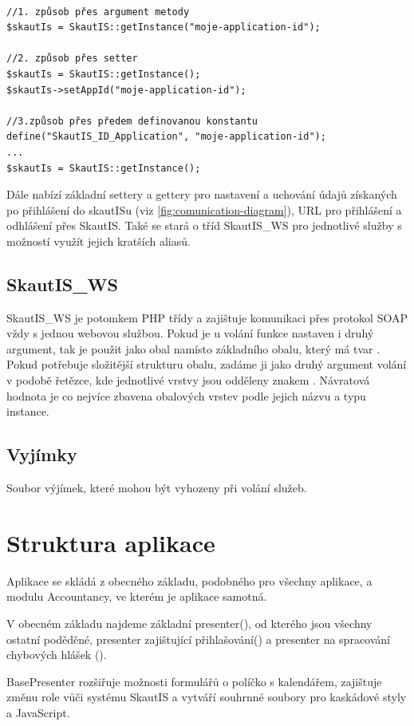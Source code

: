 \documentclass[thesis=B,czech]{FITthesis}[2011/06/14]
\begin{document}
\begin{verbatim}

//1. způsob přes argument metody
$skautIs = SkautIS::getInstance("moje-application-id");

//2. způsob přes setter
$skautIs = SkautIS::getInstance();
$skautIs->setAppId("moje-application-id"); 

//3.způsob přes předem definovanou konstantu
define("SkautIS_ID_Application", "moje-application-id"); 
...
$skautIs = SkautIS::getInstance(); 
\end{verbatim}

Dále nabízí základní settery a gettery pro nastavení a uchování údajů získaných po přihlášení do skautISu (viz \ref{fig:comunication-diagram}), URL pro přihlášení a odhlášení přes SkautIS. Také se stará o  tříd SkautIS\_WS pro jednotlivé služby s možností využít jejich kratších aliasů. 

\subsection{SkautIS\_WS}
SkautIS\_WS je potomkem PHP třídy  a zajištuje komunikaci přes protokol SOAP vždy s jednou webovou službou. Pokud je u volání funkce nastaven i druhý argument, tak je použit jako obal namísto základního obalu, který má tvar . Pokud potřebuje složitější strukturu obalu, zadáme ji jako druhý argument volání v podobě řetězce, kde jednotlivé vrstvy jsou odděleny znakem \uv{/}. Návratová hodnota je co nejvíce zbavena obalových vrstev podle jejich názvu a typu instance.

\subsection{Vyjímky}
Soubor výjímek, které mohou být vyhozeny při volání služeb.

\section{Struktura aplikace}
Aplikace se skládá z obecného základu, podobného pro všechny aplikace, a modulu Accountancy, ve kterém je aplikace samotná.

V obecném základu najdeme základní presenter(), od kterého jsou všechny ostatní poděděné, presenter zajištující přihlašování() a presenter na spracování chybových hlášek ().

BasePresenter rozšiřuje možnosti formulářů o políčko s kalendářem, zajištuje změnu role vůči systému SkautIS a vytváří souhrnné soubory pro kaskádové styly a JavaScript.
\end{document}
